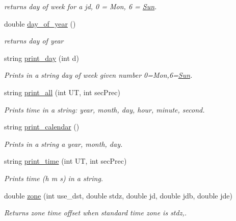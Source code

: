 \begin{DoxyCompactItemize}
\begin{DoxyCompactList}\small\item\em returns day of week for a jd, 0 = Mon, 6 = \hyperlink{class_sun}{Sun}. \end{DoxyCompactList}\item 
\hypertarget{classamzer_a857caa57e20a4a316475364d15e9e23b}{double \hyperlink{classamzer_a857caa57e20a4a316475364d15e9e23b}{day\-\_\-of\-\_\-year} ()}\label{classamzer_a857caa57e20a4a316475364d15e9e23b}

\begin{DoxyCompactList}\small\item\em returns day of year \end{DoxyCompactList}\item 
\hypertarget{classamzer_aaa17cf34497804b03e1922f8ac8f4d81}{string \hyperlink{classamzer_aaa17cf34497804b03e1922f8ac8f4d81}{print\-\_\-day} (int d)}\label{classamzer_aaa17cf34497804b03e1922f8ac8f4d81}

\begin{DoxyCompactList}\small\item\em Prints in a string day of week given number 0=Mon,6=\hyperlink{class_sun}{Sun}. \end{DoxyCompactList}\item 
string \hyperlink{classamzer_a83c30d27eb7e5068f470d2b9971310e7}{print\-\_\-all} (int U\-T, int sec\-Prec)
\begin{DoxyCompactList}\small\item\em Prints time in a string\-: year, month, day, hour, minute, second. \end{DoxyCompactList}\item 
\hypertarget{classamzer_a21e2eeb1774d428741d418626496b2d9}{string \hyperlink{classamzer_a21e2eeb1774d428741d418626496b2d9}{print\-\_\-calendar} ()}\label{classamzer_a21e2eeb1774d428741d418626496b2d9}

\begin{DoxyCompactList}\small\item\em Prints in a string a year, month, day. \end{DoxyCompactList}\item 
string \hyperlink{classamzer_ae04ab4c4e11b6495bf50597bfcf2d371}{print\-\_\-time} (int U\-T, int sec\-Prec)
\begin{DoxyCompactList}\small\item\em Prints time (h m s) in a string. \end{DoxyCompactList}\item 
double \hyperlink{classamzer_a6ead4d59a18832d743ee18c92111b3b1}{zone} (int use\-\_\-dst, double stdz, double jd, double jdb, double jde)
\begin{DoxyCompactList}\small\item\em Returns zone time offset when standard time zone is stdz,. \end{DoxyCompactList}\end{DoxyCompactItemize}
